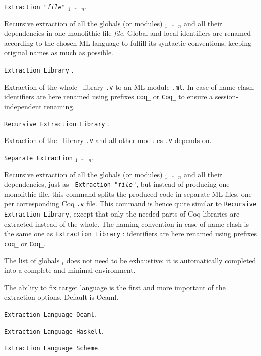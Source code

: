 \begin{description}
\item {\tt Extraction "{\em file}"}  
      \qualid$_1$ \dots\ \qualid$_n$. ~\par
  Recursive extraction of all the globals (or modules) \qualid$_1$ \dots\
  \qualid$_n$ and all their dependencies in one monolithic file {\em file}.
  Global and local identifiers are renamed according to the chosen ML
  language to fulfill its syntactic conventions, keeping original
  names as much as possible.
  
\item {\tt Extraction Library} \ident. ~\par 
  Extraction of the whole \Coq\ library {\tt\ident.v} to an ML module
  {\tt\ident.ml}.  In case of name clash, identifiers are here renamed
  using prefixes \verb!coq_!  or \verb!Coq_! to ensure a
  session-independent renaming.

\item {\tt Recursive Extraction Library} \ident. ~\par
  Extraction of the \Coq\ library {\tt\ident.v} and all other modules 
  {\tt\ident.v} depends on. 

\item {\tt Separate Extraction}
      \qualid$_1$ \dots\ \qualid$_n$. ~\par
  Recursive extraction of all the globals (or modules) \qualid$_1$ \dots\
  \qualid$_n$ and all their dependencies, just as {\tt
    Extraction "{\em file}"}, but instead of producing one monolithic
  file, this command splits the produced code in separate ML files, one per
  corresponding Coq {\tt .v} file. This command is hence quite similar
  to {\tt Recursive Extraction Library}, except that only the needed
  parts of Coq libraries are extracted instead of the whole. The
  naming convention in case of name clash is the same one as
  {\tt Extraction Library} : identifiers are here renamed
  using prefixes \verb!coq_!  or \verb!Coq_!.
\end{description}

The list of globals \qualid$_i$ does not need to be
exhaustive: it is automatically completed into a complete and minimal
environment. 



The ability to fix target language is the first and more important
of the extraction options. Default is Ocaml.
\begin{description}
\item {\tt Extraction Language Ocaml}.
\item {\tt Extraction Language Haskell}.
\item {\tt Extraction Language Scheme}.
\end{description}

